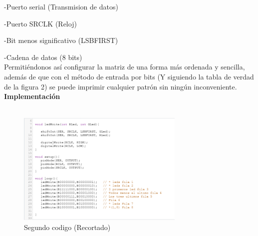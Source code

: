 \documentclass{article}
\begin{document}
-Puerto serial (Transmision de datos)

-Puerto SRCLK (Reloj)

-Bit menos significativo (LSBFIRST)

-Cadena de datos (8 bits)\\


Permitiéndonos así configurar la matriz de una forma más ordenada y sencilla, además de que con el método de entrada por bits (Y siguiendo la tabla de verdad  de la figura 2) se puede imprimir cualquier patrón sin ningún inconveniente.\\

\textbf{\large Implementación}\\\\
\begin{figure}[h]
    \includegraphics[width=8cm]{Imagen4.png}
    \centering
    \caption{Segundo codigo (Recortado)}
    \label{fig:Imagen4}
\end{figure}\\\\
\end{document}
